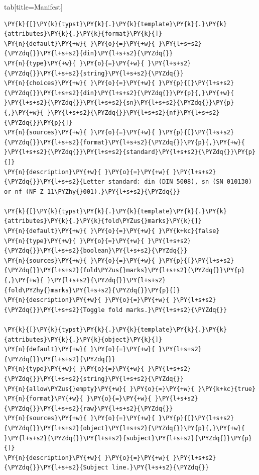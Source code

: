 \documentclass[a4paper,twoside]{article}
\begin{document}
\begin{tsdiv}{tab}[title=Manifest]
\begin{tscode}[lang=toml, engine=pygments]
\begin{Verbatim}[commandchars=\\\{\},breaklines, breakanywhere, commandchars=\\\{\}]
\PY{k}{[}\PY{k}{typst}\PY{k}{.}\PY{k}{template}\PY{k}{.}\PY{k}{attributes}\PY{k}{.}\PY{k}{format}\PY{k}{]}
\PY{n}{default}\PY{+w}{ }\PY{o}{=}\PY{+w}{ }\PY{l+s+s2}{\PYZdq{}}\PY{l+s+s2}{din}\PY{l+s+s2}{\PYZdq{}}
\PY{n}{type}\PY{+w}{ }\PY{o}{=}\PY{+w}{ }\PY{l+s+s2}{\PYZdq{}}\PY{l+s+s2}{string}\PY{l+s+s2}{\PYZdq{}}
\PY{n}{choices}\PY{+w}{ }\PY{o}{=}\PY{+w}{ }\PY{p}{[}\PY{l+s+s2}{\PYZdq{}}\PY{l+s+s2}{din}\PY{l+s+s2}{\PYZdq{}}\PY{p}{,}\PY{+w}{ }\PY{l+s+s2}{\PYZdq{}}\PY{l+s+s2}{sn}\PY{l+s+s2}{\PYZdq{}}\PY{p}{,}\PY{+w}{ }\PY{l+s+s2}{\PYZdq{}}\PY{l+s+s2}{nf}\PY{l+s+s2}{\PYZdq{}}\PY{p}{]}
\PY{n}{sources}\PY{+w}{ }\PY{o}{=}\PY{+w}{ }\PY{p}{[}\PY{l+s+s2}{\PYZdq{}}\PY{l+s+s2}{format}\PY{l+s+s2}{\PYZdq{}}\PY{p}{,}\PY{+w}{ }\PY{l+s+s2}{\PYZdq{}}\PY{l+s+s2}{standard}\PY{l+s+s2}{\PYZdq{}}\PY{p}{]}
\PY{n}{description}\PY{+w}{ }\PY{o}{=}\PY{+w}{ }\PY{l+s+s2}{\PYZdq{}}\PY{l+s+s2}{Letter standard: din (DIN 5008), sn (SN 010130) or nf (NF Z 11\PYZhy{}001).}\PY{l+s+s2}{\PYZdq{}}

\PY{k}{[}\PY{k}{typst}\PY{k}{.}\PY{k}{template}\PY{k}{.}\PY{k}{attributes}\PY{k}{.}\PY{k}{fold\PYZus{}marks}\PY{k}{]}
\PY{n}{default}\PY{+w}{ }\PY{o}{=}\PY{+w}{ }\PY{k+kc}{false}
\PY{n}{type}\PY{+w}{ }\PY{o}{=}\PY{+w}{ }\PY{l+s+s2}{\PYZdq{}}\PY{l+s+s2}{boolean}\PY{l+s+s2}{\PYZdq{}}
\PY{n}{sources}\PY{+w}{ }\PY{o}{=}\PY{+w}{ }\PY{p}{[}\PY{l+s+s2}{\PYZdq{}}\PY{l+s+s2}{fold\PYZus{}marks}\PY{l+s+s2}{\PYZdq{}}\PY{p}{,}\PY{+w}{ }\PY{l+s+s2}{\PYZdq{}}\PY{l+s+s2}{fold\PYZhy{}marks}\PY{l+s+s2}{\PYZdq{}}\PY{p}{]}
\PY{n}{description}\PY{+w}{ }\PY{o}{=}\PY{+w}{ }\PY{l+s+s2}{\PYZdq{}}\PY{l+s+s2}{Toggle fold marks.}\PY{l+s+s2}{\PYZdq{}}

\PY{k}{[}\PY{k}{typst}\PY{k}{.}\PY{k}{template}\PY{k}{.}\PY{k}{attributes}\PY{k}{.}\PY{k}{object}\PY{k}{]}
\PY{n}{default}\PY{+w}{ }\PY{o}{=}\PY{+w}{ }\PY{l+s+s2}{\PYZdq{}}\PY{l+s+s2}{\PYZdq{}}
\PY{n}{type}\PY{+w}{ }\PY{o}{=}\PY{+w}{ }\PY{l+s+s2}{\PYZdq{}}\PY{l+s+s2}{string}\PY{l+s+s2}{\PYZdq{}}
\PY{n}{allow\PYZus{}empty}\PY{+w}{ }\PY{o}{=}\PY{+w}{ }\PY{k+kc}{true}
\PY{n}{format}\PY{+w}{ }\PY{o}{=}\PY{+w}{ }\PY{l+s+s2}{\PYZdq{}}\PY{l+s+s2}{raw}\PY{l+s+s2}{\PYZdq{}}
\PY{n}{sources}\PY{+w}{ }\PY{o}{=}\PY{+w}{ }\PY{p}{[}\PY{l+s+s2}{\PYZdq{}}\PY{l+s+s2}{object}\PY{l+s+s2}{\PYZdq{}}\PY{p}{,}\PY{+w}{ }\PY{l+s+s2}{\PYZdq{}}\PY{l+s+s2}{subject}\PY{l+s+s2}{\PYZdq{}}\PY{p}{]}
\PY{n}{description}\PY{+w}{ }\PY{o}{=}\PY{+w}{ }\PY{l+s+s2}{\PYZdq{}}\PY{l+s+s2}{Subject line.}\PY{l+s+s2}{\PYZdq{}}


\end{Verbatim}
\end{tscode}
\end{tsdiv}
\end{document}

